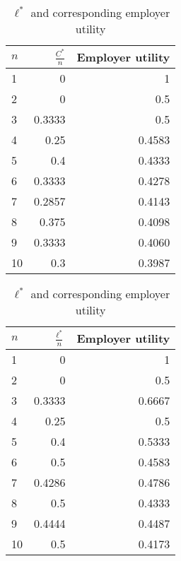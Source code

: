 \documentclass{article}
\begin{document}
\begin{table}[H] 
\centering
\begin{minipage}{0.5\textwidth}
\small
\begin{tabular}{lrr} 
\hline
$n$ & $\frac{C^*}{n}$ & Employer utility \\
\hline
1  &     0 &         1 \\
2  &     0 &         0.5 \\
3  &     0.3333 &         0.5 \\
4  &     0.25 &         0.4583 \\
5  &     0.4 &         0.4333 \\
6  &     0.3333 &         0.4278 \\
7  &     0.2857 &         0.4143 \\
8  &     0.375 &         0.4098 \\
9  &     0.3333 &         0.4060 \\
10 &     0.3 &         0.3987 \\
\hline
\end{tabular}
\caption{$C^*$ and corresponding employer utility}
\label{tab:Comparison}
\end{minipage}\hfill
\centering
\begin{minipage}{0.5\textwidth}
\small
\begin{tabular}{lrr}
\hline
$n$ & $\frac{\ell^*}{n}$ & Employer utility \\
\hline
1  &     0 &         1 \\
2  &     0 &         0.5 \\
3  &     0.3333 &         0.6667 \\
4  &     0.25 &         0.5 \\
5  &     0.4 &         0.5333 \\
6  &     0.5 &         0.4583 \\
7  &     0.4286 &         0.4786 \\
8  &     0.5 &         0.4333 \\
9  &     0.4444 &         0.4487 \\
10 &     0.5 &         0.4173 \\
\hline
\end{tabular}
\caption{$\ell^*$ and corresponding employer utility}
\end{minipage}\hfill
\end{table}
\end{document}
